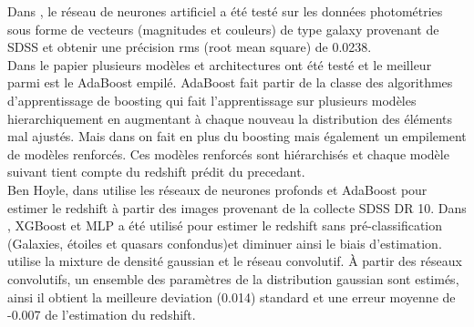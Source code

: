 Dans \cite{adrian}, le réseau de neurones artificiel a été testé sur les données photométries sous forme de vecteurs (magnitudes et couleurs) de type galaxy provenant de SDSS et obtenir une précision rms (root mean square) de 0.0238.\\
Dans le papier \cite{stack} plusieurs modèles et architectures ont été testé et le meilleur parmi est le AdaBoost empilé. AdaBoost fait partir de la classe des algorithmes d'apprentissage de boosting qui fait l'apprentissage sur plusieurs modèles hierarchiquement en augmentant à chaque nouveau la distribution des éléments mal ajustés. Mais dans \cite{stack} on fait en plus du boosting mais également un empilement de modèles renforcés. Ces modèles renforcés sont hiérarchisés et chaque modèle suivant tient compte du redshift prédit du precedant.\\
Ben Hoyle, dans \cite{ben} utilise les réseaux de neurones profonds et AdaBoost pour estimer le redshift à partir des images provenant de la collecte SDSS DR 10. Dans \cite{meuphirim}, XGBoost et MLP a été utilisé pour estimer le redshift sans pré-classification (Galaxies, étoiles et quasars confondus)et diminuer ainsi  le biais d'estimation. \cite{isanto} utilise la mixture de densité gaussian et le réseau convolutif. À partir des réseaux convolutifs, un ensemble des paramètres de la distribution gaussian sont estimés, ainsi il obtient la meilleure deviation (0.014) standard et une erreur moyenne de -0.007 de l'estimation du redshift. 



























